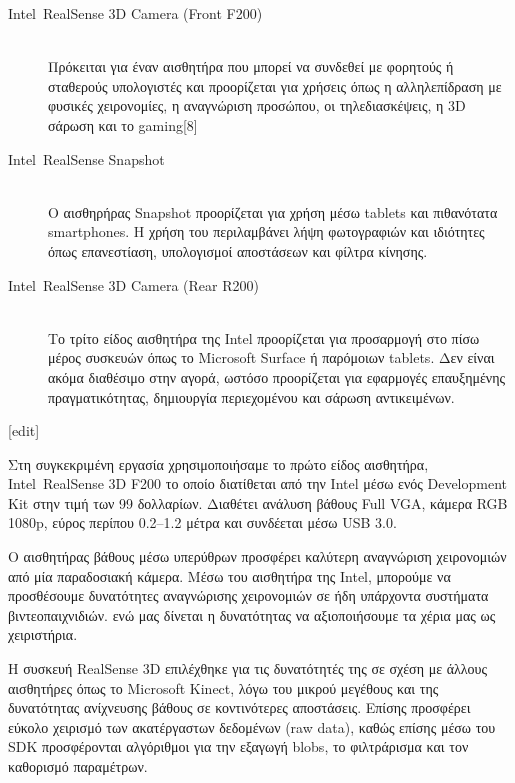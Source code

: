 \begin{description}
  \item[Intel\textregistered\ RealSense\texttrademark{} 3D Camera (Front F200)] \hfill \\
  Πρόκειται για έναν αισθητήρα που μπορεί να συνδεθεί με φορητούς ή σταθερούς υπολογιστές και προορίζεται για χρήσεις όπως η αλληλεπίδραση με φυσικές χειρονομίες, η αναγνώριση προσώπου, οι τηλεδιασκέψεις, η 3D σάρωση και το gaming[8]
  
  \item[Intel\textregistered\ RealSense\texttrademark{} Snapshot] \hfill \\
 Ο αισθηρήρας Snapshot προορίζεται για χρήση μέσω tablets και πιθανότατα smartphones. Η χρήση του περιλαμβάνει λήψη φωτογραφιών και ιδιότητες όπως επανεστίαση, υπολογισμοί αποστάσεων και φίλτρα κίνησης. 


  \item[Intel\textregistered\ RealSense\texttrademark{} 3D Camera (Rear R200)] \hfill \\
  Το τρίτο είδος αισθητήρα της Intel προορίζεται για προσαρμογή στο πίσω μέρος συσκευών όπως το Microsoft Surface ή παρόμοιων tablets. Δεν είναι ακόμα διαθέσιμο στην αγορά, ωστόσο προορίζεται για εφαρμογές επαυξημένης πραγματικότητας, δημιουργία περιεχομένου και σάρωση αντικειμένων.
\end{description}
[edit]



Στη συγκεκριμένη εργασία χρησιμοποιήσαμε το πρώτο είδος αισθητήρα, Intel\textregistered\ RealSense\texttrademark{} 3D F200 το οποίο διατίθεται από την Intel μέσω ενός Development Kit στην τιμή των 99 δολλαρίων. Διαθέτει ανάλυση βάθους Full VGA, κάμερα RGB 1080p, εύρος περίπου 0.2–1.2 μέτρα και συνδέεται μέσω USB 3.0.


Ο αισθητήρας βάθους μέσω υπερύθρων προσφέρει καλύτερη αναγνώριση χειρονομιών από μία παραδοσιακή κάμερα. Μέσω του αισθητήρα της Intel, μπορούμε να προσθέσουμε δυνατότητες αναγνώρισης χειρονομιών σε ήδη υπάρχοντα συστήματα βιντεοπαιχνιδιών.
ενώ μας δίνεται η δυνατότητας να αξιοποιήσουμε τα χέρια μας ως χειριστήρια.

Η συσκευή RealSense 3D επιλέχθηκε για τις δυνατότητές της σε σχέση με άλλους αισθητήρες όπως το Microsoft Kinect, λόγω του μικρού μεγέθους και της δυνατότητας ανίχνευσης βάθους σε κοντινότερες αποστάσεις. Επίσης προσφέρει εύκολο χειρισμό των ακατέργαστων δεδομένων (raw data), καθώς επίσης μέσω του SDK προσφέρονται αλγόριθμοι για την εξαγωγή blobs, το φιλτράρισμα και τον καθορισμό παραμέτρων. 



